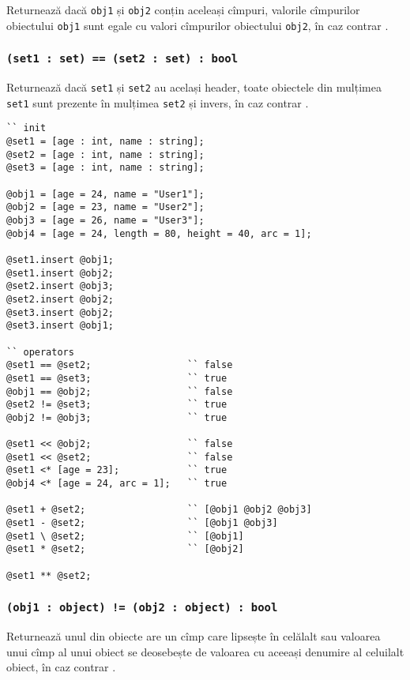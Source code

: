 Returnează \true{} dacă \texttt{obj1} și \texttt{obj2} conțin aceleași cîmpuri, valorile cîmpurilor obiectului \texttt{obj1} sunt egale cu valori cîmpurilor obiectului \texttt{obj2}, în caz contrar \false{}.

\subsubsection{\texttt{(set1 : set) == (set2 : set) : bool}}

Returnează \true{} dacă \texttt{set1} și \texttt{set2} au același header, toate obiectele din mulțimea \texttt{set1} sunt prezente în mulțimea \texttt{set2} și invers, în caz contrar \false{}.

\begin{sourcecode}
\label{setobjopex}
\begin{verbatim}
`` init
@set1 = [age : int, name : string];
@set2 = [age : int, name : string];
@set3 = [age : int, name : string];

@obj1 = [age = 24, name = "User1"];
@obj2 = [age = 23, name = "User2"];
@obj3 = [age = 26, name = "User3"];
@obj4 = [age = 24, length = 80, height = 40, arc = 1];

@set1.insert @obj1;
@set1.insert @obj2;
@set2.insert @obj3;
@set2.insert @obj2;
@set3.insert @obj2;
@set3.insert @obj1;

`` operators
@set1 == @set2;					`` false
@set1 == @set3;					`` true
@obj1 == @obj2;					`` false
@set2 != @set3;					`` true
@obj2 != @obj3;					`` true

@set1 << @obj2;					`` false
@set1 << @set2;					`` false
@set1 <* [age = 23];			`` true
@obj4 <* [age = 24, arc = 1];	`` true

@set1 + @set2;					`` [@obj1 @obj2 @obj3]
@set1 - @set2;					`` [@obj1 @obj3]
@set1 \ @set2;					`` [@obj1]
@set1 * @set2;					`` [@obj2]

@set1 ** @set2;	
\end{verbatim}
\end{sourcecode}

\subsubsection{\texttt{(obj1 : object) != (obj2 : object) : bool}}

Returnează \true{} unul din obiecte are un cîmp care lipsește în celălalt sau valoarea unui cîmp al unui obiect se deosebește de valoarea cu aceeași denumire al celuilalt obiect, în caz contrar \false{}.

